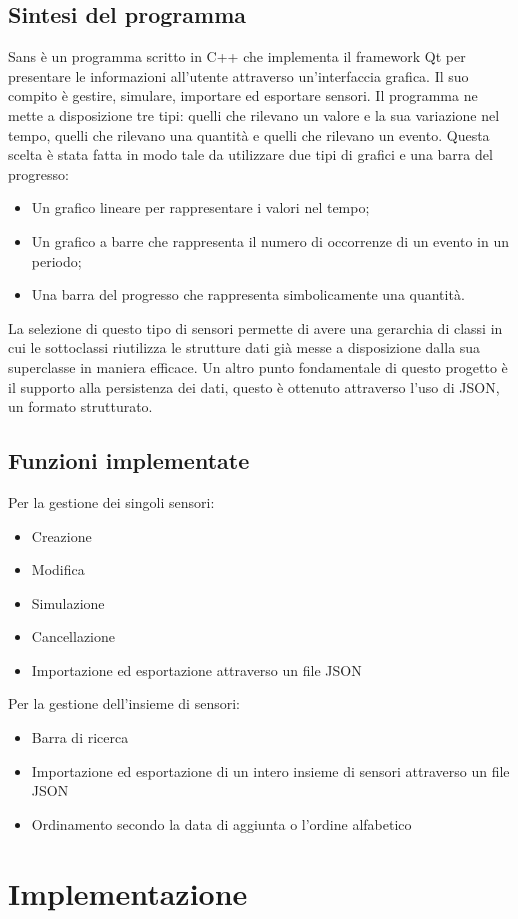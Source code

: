 \documentclass[a4paper]{article}
\begin{document}
\subsection{Sintesi del programma}
Sans è un programma scritto in C++ che implementa il framework Qt per presentare le informazioni all'utente attraverso un'interfaccia grafica. Il suo compito è gestire, simulare, importare ed esportare sensori.
Il programma ne mette a disposizione tre tipi: quelli che rilevano un valore e la sua variazione nel tempo, quelli che rilevano una quantità e quelli che rilevano un evento.
Questa scelta è stata fatta in modo tale da utilizzare due tipi di grafici e una barra del progresso: 
\begin{itemize}
    \item Un grafico lineare per rappresentare i valori nel tempo;
    \item Un grafico a barre che rappresenta il numero di occorrenze di un evento in un periodo;
    \item Una barra del progresso che rappresenta simbolicamente una quantità.
\end{itemize}
La selezione di questo tipo di sensori permette di avere una gerarchia di classi in cui le sottoclassi riutilizza le strutture dati già messe a disposizione dalla sua superclasse in maniera efficace.
Un altro punto fondamentale di questo progetto è il supporto alla persistenza dei dati, questo è ottenuto attraverso l'uso di JSON, un formato strutturato.
\subsection{Funzioni implementate}
Per la gestione dei singoli sensori:
\begin{itemize}
    \item Creazione
    \item Modifica
    \item Simulazione
    \item Cancellazione
    \item Importazione ed esportazione attraverso un file JSON
\end{itemize}
Per la gestione dell'insieme di sensori:
\begin{itemize}
    \item Barra di ricerca
    \item Importazione ed esportazione di un intero insieme di sensori attraverso un file JSON
    \item Ordinamento secondo la data di aggiunta o l'ordine alfabetico
\end{itemize}
\clearpage
\section{Implementazione}
\end{document}
